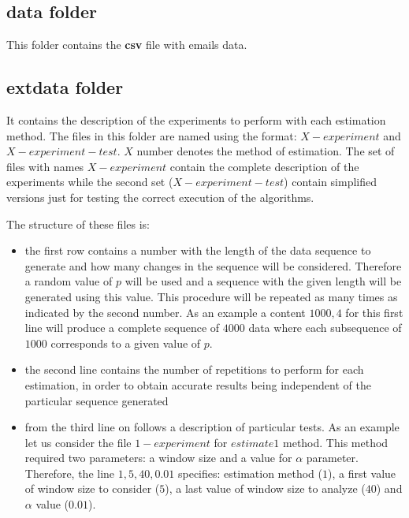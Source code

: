 \documentclass{article}
\begin{document}
\subsection{data folder}

This folder contains the \textbf{csv} file with emails data.

\subsection{extdata folder}

It contains the description of the experiments to perform with each estimation
method. The files in this folder are named using the format: $X-experiment$
and $X-experiment-test$. $X$ number denotes the method of estimation. The set
of files with names $X-experiment$ contain the complete description of the
experiments while the second set ($X-experiment-test$) contain simplified
versions just for testing the correct execution of the algorithms.

\medskip

The structure of these files is:

\begin{itemize}
\item the first row contains a number with the length of the data sequence
to generate and how many changes in the sequence will be considered. Therefore
a random value of $p$ will be used and a sequence with the given length will
be generated using this value. This procedure will be repeated as many times
as indicated by the second number. As an example a content $1000, 4$ for this
first line will produce a complete sequence of $4000$ data where each subsequence
of $1000$ corresponds to a given value of $p$.

\item the second line contains the number of repetitions to perform for each
estimation, in order to obtain accurate results being independent of the particular
sequence generated

\item from the third line on follows a description of particular tests. As an
example let us consider the file $1-experiment$ for $estimate1$ method. This
method required two parameters: a window size and a value for $\alpha$ parameter.
Therefore, the line $1, 5, 40, 0.01$ specifies: estimation method ($1$),
a first value of window size to consider ($5$), a last value of window size to
analyze ($40$) and $\alpha$ value ($0.01$).
\end{itemize}
\end{document}
